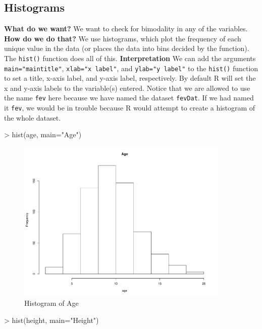 \documentclass[landscape]{article}
\renewenvironment{Schunk}{\vspace{\topsep}}{\vspace{\topsep}}
\begin{document}
\subsection{Histograms}
{\large \textbf{What do we want?}} \newline
We want to check for bimodality in any of the variables. \newline
{\large \textbf{How do we do that?}} \newline
We use histograms, which plot the frequency of each unique value in the data (or places the data into bins decided by the function). The \texttt{hist()} function does all of this. \newline
{\large \textbf{Interpretation}}\newline
We can add the arguments \texttt{main="maintitle"}, \texttt{xlab="x label"}, and \texttt{ylab="y label"} to the \texttt{hist()} function to set a title, x-axis label, and y-axis label, respectively. By default R will set the x and y-axis labels to the variable(s) entered. Notice that we are allowed to use the name \texttt{fev} here because we have named the dataset \texttt{fevDat}. If we had named it \texttt{fev}, we would be in trouble because R would attempt to create a histogram of the whole dataset.
\begin{Schunk}
\begin{Sinput}
> hist(age, main="Age")
\end{Sinput}
\end{Schunk}
\begin{figure}[h]
\centering
\includegraphics[width=4in, height=3.08in]{fevdoc-agehist}
\caption{Histogram of Age}
\label{agehist}
\end{figure}
\clearpage
\begin{Schunk}
\begin{Sinput}
> hist(height, main="Height")
\end{Sinput}
\end{Schunk}
\end{document}
